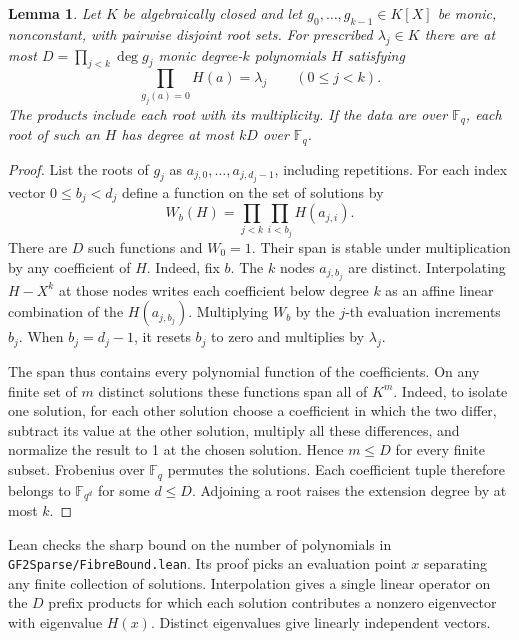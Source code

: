 \documentclass[11pt]{article}
\newtheorem{lemma}[theorem]{Lemma}
\begin{document}
\begin{lemma}\label{lem:disjoint-fibres}
Let \(K\) be algebraically closed and let \(g_0,\ldots,g_{k-1}\in K[X]\)
be monic, nonconstant, with pairwise disjoint root sets. For prescribed
\(\lambda_j\in K\) there are at most \(D=\prod_{j<k}\deg g_j\) monic
degree-\(k\) polynomials \(H\) satisfying
\[
                 \prod_{g_j(a)=0}H(a)=\lambda_j\qquad(0\le j<k).
\]
The products include each root with its multiplicity. If the data are
over \(\mathbb F_q\), each root of such an \(H\) has degree at most
\(kD\) over \(\mathbb F_q\).
\end{lemma}
\begin{proof}
List the roots of \(g_j\) as \(a_{j,0},\ldots,a_{j,d_j-1}\),
including repetitions. For each index vector \(0\le b_j<d_j\)
define a function on the set of solutions by
\[
                    W_b(H)=\prod_{j<k}\prod_{i<b_j}H(a_{j,i}).
\]
There are \(D\) such functions and \(W_0=1\). Their span is stable
under multiplication by any coefficient of \(H\). Indeed, fix \(b\).
The \(k\) nodes \(a_{j,b_j}\) are distinct. Interpolating \(H-X^k\)
at those nodes writes each coefficient below degree \(k\) as an affine
linear combination of the \(H(a_{j,b_j})\). Multiplying \(W_b\) by
the \(j\)-th evaluation increments \(b_j\). When \(b_j=d_j-1\),
it resets \(b_j\) to zero and multiplies by \(\lambda_j\).

The span thus contains every polynomial function of the coefficients.
On any finite set of \(m\) distinct solutions these functions span
all of \(K^m\). Indeed, to isolate one solution, for each other
solution choose a coefficient in which the two differ, subtract its
value at the other solution, multiply all these differences, and
normalize the result to 1 at the chosen solution. Hence \(m\le D\)
for every finite subset. Frobenius over \(\mathbb F_q\) permutes
the solutions. Each coefficient tuple therefore belongs to
\(\mathbb F_{q^d}\) for some \(d\le D\). Adjoining a root raises the
extension degree by at most \(k\).
\end{proof}
Lean checks the sharp bound on the number of polynomials in
\texttt{GF2Sparse/FibreBound.lean}. Its proof picks an evaluation
point \(x\) separating any finite collection of solutions. Interpolation
gives a single linear operator on the \(D\) prefix products for which
each solution contributes a nonzero eigenvector with eigenvalue \(H(x)\).
Distinct eigenvalues give linearly independent vectors.
\end{document}
